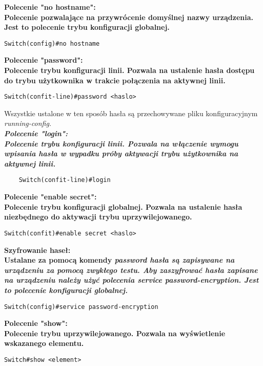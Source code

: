 \documentclass[a4paper,12pt]{article}
\newcommand{\h}[1]{\noindent \bf #1 \rm \\ \noindent}
\begin{document}
\h{Polecenie "no hostname":}
Polecenie pozwalające na przywrócenie domyślnej nazwy urządzenia. Jest to polecenie trybu konfiguracji globalnej.
\begin{lstlisting}
Switch(config)#no hostname
\end{lstlisting}
\vspace{5mm}

\h{Polecenie "password":}
Polecenie trybu konfiguracji linii. Pozwala na ustalenie hasła dostępu do trybu użytkownika w trakcie połączenia na aktywnej linii.
\begin{lstlisting}
Switch(confit-line)#password <haslo>
\end{lstlisting}
\vspace{5mm}

\noindent
Wszystkie ustalone w ten sposób hasła są przechowywane pliku konfiguracyjnym \it running-config\rm.\\

\h{Polecenie "login":}
Polecenie trybu konfiguracji linii. Pozwala na włączenie wymogu wpisania hasła w wypadku próby aktywacji trybu użytkownika na aktywnej linii.
\begin{lstlisting}
	Switch(confit-line)#login
\end{lstlisting}
\vspace{5mm}

\h{Polecenie "enable secret":}
Polecenie trybu konfiguracji globalnej. Pozwala na ustalenie hasła niezbędnego do aktywacji trybu uprzywilejowanego.
\begin{lstlisting}
Switch(confit)#enable secret <haslo>
\end{lstlisting}
\vspace{5mm}

\h{Szyfrowanie haseł:}
Ustalane za pomocą komendy \it password \rm hasła są zapisywane na urządzeniu za pomocą zwykłego testu. Aby zaszyfrować hasła zapisane na urządzeniu należy użyć polecenia \it service password-encryption\rm. Jest to polecenie konfiguracji globalnej.
\begin{lstlisting}
Switch(config)#service password-encryption
\end{lstlisting}
\vspace{5mm}

\h{Polecenie "show":}
Polecenie trybu uprzywilejowanego. Pozwala na wyświetlenie wskazanego elementu.
\begin{lstlisting}
Switch#show <element>
\end{lstlisting}
\vspace{5mm}
\end{document}
